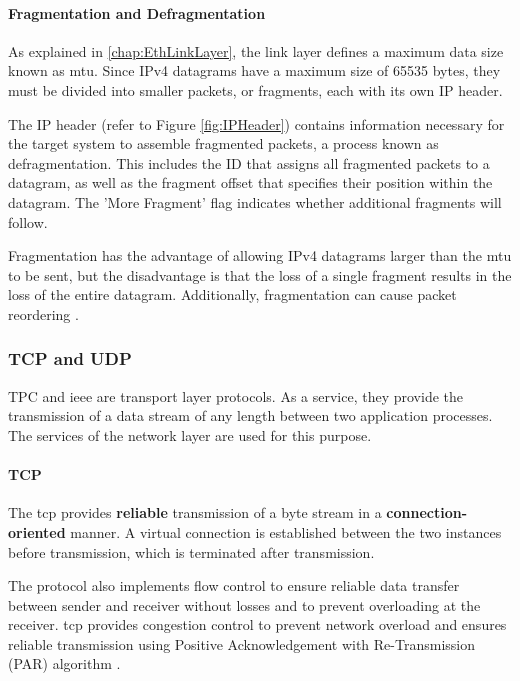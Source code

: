 \paragraph{Fragmentation and Defragmentation} \label{chap:frag}

As explained in \ref{chap:EthLinkLayer}, the link layer defines a maximum data size known as \ac{mtu}. Since IPv4 datagrams have a maximum size of 65535 bytes, they must be divided into smaller packets, or fragments, each with its own IP header.

The IP header (refer to Figure \ref{fig:IPHeader}) contains information necessary for the target system to assemble fragmented packets, a process known as defragmentation. This includes the ID that assigns all fragmented packets to a datagram, as well as the fragment offset that specifies their position within the datagram. The 'More Fragment' flag indicates whether additional fragments will follow.

Fragmentation has the advantage of allowing IPv4 datagrams larger than the \ac{mtu} to be sent, but the disadvantage is that the loss of a single fragment results in the loss of the entire datagram. Additionally, fragmentation can cause packet reordering \cite{IPFragDetail}.

\subsubsection{TCP and UDP}
TPC and \ac{ieee} are transport layer protocols. As a service, they provide the transmission of a data stream of any length between two application processes. The services of the network layer are used for this purpose.

\paragraph{TCP}

The \acf{tcp} provides \textbf{reliable} transmission of a byte stream in a \textbf{connection-oriented} manner. A virtual connection is established between the two instances before transmission, which is terminated after transmission.

The protocol also implements flow control to ensure reliable data transfer between sender and receiver without losses and to prevent overloading at the receiver. \ac{tcp} provides congestion control to prevent network overload and ensures reliable transmission using Positive Acknowledgement with Re-Transmission (PAR) algorithm \cite{Holtkamp2024Transport}.  


